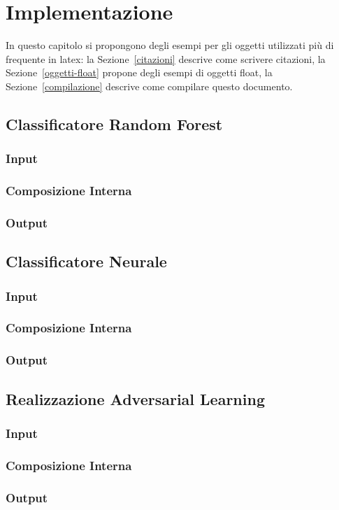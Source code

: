 \chapter{Implementazione}
\label{implementazione}

In questo capitolo si propongono degli esempi per gli oggetti utilizzati più di frequente in latex: la Sezione~\ref{citazioni} descrive come scrivere citazioni, la Sezione~\ref{oggetti-float} propone degli esempi di oggetti float, la Sezione~\ref{compilazione} descrive come compilare questo documento.

\section{Classificatore Random Forest}
\label{imprandomforest}

\subsection{Input}
\label{imprandomforestinput}

\subsection{Composizione Interna}
\label{imprandomforestinterno}

\subsection{Output}
\label{imprandomforestoutput}

\section{Classificatore Neurale}
\label{impclassificatorenn}

\subsection{Input}
\label{impclassificatorenninput}

\subsection{Composizione Interna}
\label{impclassificatorenninterno}

\subsection{Output}
\label{impclassificatorennoutput}

\section{Realizzazione Adversarial Learning}
\label{impadv}

\subsection{Input}
\label{impadvinput}

\subsection{Composizione Interna}
\label{impadvinterno}

\subsection{Output}
\label{advoutput}